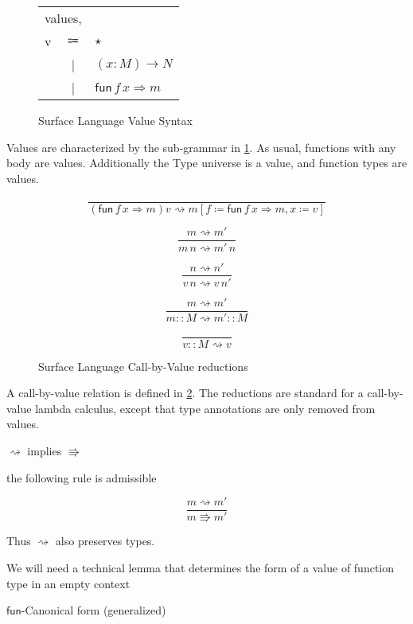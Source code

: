 \begin{figure}
\begin{tabular}{lcl}
\multicolumn{3}{l}{values,}\tabularnewline
v & $\Coloneqq$ & $\star$\tabularnewline
 & | & $\left(x:M\right)\rightarrow N$\tabularnewline
 & | & $\mathsf{fun}\,f\,x\Rightarrow m$\tabularnewline
\end{tabular}\caption{Surface Language Value Syntax}
\label{fig:surface-value-syntax}
\end{figure}

Values are characterized by the sub-grammar in \ref{fig:surface-value-syntax}.
As usual, functions with any body are values. Additionally the Type
universe is a value, and function types are values.

\begin{figure}
\[
\frac{\,}{\left(\mathsf{fun}\,f\,x\Rightarrow m\right)v\rightsquigarrow m\left[f\coloneqq\mathsf{fun}\,f\,x\Rightarrow m,x\coloneqq v\right]}
\]

\[
\frac{m\rightsquigarrow m'}{m\,n\rightsquigarrow m'\,n}
\]

\[
\frac{n\rightsquigarrow n'}{v\,n\rightsquigarrow v\,n'}
\]

\[
\frac{m\rightsquigarrow m'}{m::M\rightsquigarrow m'::M}
\]

\[
\frac{\,}{v::M\rightsquigarrow v}
\]

\caption{Surface Language Call-by-Value reductions}
\label{fig:surface-reduction-step}
\end{figure}

A call-by-value relation is defined in \ref{fig:surface-reduction-step}.
The reductions are standard for a call-by-value lambda calculus, except
that type annotations are only removed from values. 

\begin{fact}
$\rightsquigarrow$ implies $\Rrightarrow$

the following rule is admissible

\[
\frac{m\rightsquigarrow m'}{m\Rrightarrow m'}
\]
\end{fact}

Thus $\rightsquigarrow$ also preserves types.

We will need a technical lemma that determines the form of a value
of function type in an empty context
\begin{lem}
$\mathsf{fun}$-Canonical form (generalized)
\end{lem}

